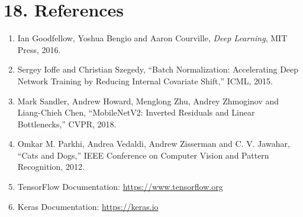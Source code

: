 \documentclass[10pt]{article}
\begin{document}
\section*{18. References}

\begin{enumerate}
\item Ian Goodfellow, Yoshua Bengio and Aaron Courville,
\emph{Deep Learning}, MIT Press, 2016.

\item Sergey Ioffe and Christian Szegedy,
``Batch Normalization: Accelerating Deep Network Training by Reducing
Internal Covariate Shift,'' ICML, 2015.

\item Mark Sandler, Andrew Howard, Menglong Zhu, Andrey Zhmoginov and
Liang-Chieh Chen, ``MobileNetV2: Inverted Residuals and Linear
Bottlenecks,'' CVPR, 2018.

\item Omkar M. Parkhi, Andrea Vedaldi, Andrew Zisserman and C. V. Jawahar,
``Cats and Dogs,'' IEEE Conference on Computer Vision and Pattern
Recognition, 2012.

\item TensorFlow Documentation:
\url{https://www.tensorflow.org}

\item Keras Documentation:
\url{https://keras.io}
\end{enumerate}
\end{document}
